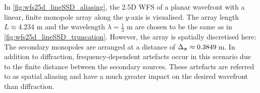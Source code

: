 In \myfig\ref{fig:wfs25d_lineSSD_aliasing}, the 2.5D WFS of a planar wavefront
with a linear, finite monopole array along the $y$-axis is visualised.
%
The array length $L \approx 4{.}234$ m and the wavelength
$\lambda=\frac{1}{3}$ m are chosen to be the same as
in \myfig\ref{fig:wfs25d_lineSSD_truncation}.
%
However, the array is spatially discretised here: The secondary monopoles
are arranged at a distance of $\Delta_{\bm{x}}\approx 0{.}3849$\,m.
%
In addition to diffraction, frequency-dependent artefacts occur in this
scenario due to the finite distance between the secondary sources.
%
These artefacts are referred to as spatial aliasing
and have a much greater impact on the desired wavefront than diffraction.



